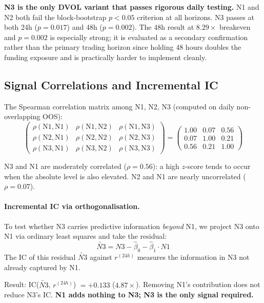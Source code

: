 \documentclass[12pt, a4paper]{article}
\theoremstyle{plain}
\theoremstyle{definition}
\begin{document}
\textbf{N3 is the only DVOL variant that passes rigorous daily testing.}
N1 and N2 both fail the block-bootstrap $p < 0.05$ criterion at all horizons.
N3 passes at both 24h ($p = 0.017$) and 48h ($p = 0.002$). The 48h result
at $8.29\times$ breakeven and $p = 0.002$ is especially strong; it is
evaluated as a secondary confirmation rather than the primary trading horizon
since holding 48 hours doubles the funding exposure and is practically
harder to implement cleanly.

\subsection{Signal Correlations and Incremental IC}
\label{sec:incremental}

The Spearman correlation matrix among N1, N2, N3 (computed on daily
non-overlapping OOS):
\[
  \begin{pmatrix}
    \rho(\text{N1},\text{N1}) & \rho(\text{N1},\text{N2}) & \rho(\text{N1},\text{N3}) \\
    \rho(\text{N2},\text{N1}) & \rho(\text{N2},\text{N2}) & \rho(\text{N2},\text{N3}) \\
    \rho(\text{N3},\text{N1}) & \rho(\text{N3},\text{N2}) & \rho(\text{N3},\text{N3})
  \end{pmatrix}
  =
  \begin{pmatrix}
    1.00 & 0.07 & 0.56 \\
    0.07 & 1.00 & 0.21 \\
    0.56 & 0.21 & 1.00
  \end{pmatrix}
\]

N3 and N1 are moderately correlated ($\rho = 0.56$): a high $z$-score
tends to occur when the absolute level is also elevated. N2 and N1
are nearly uncorrelated ($\rho = 0.07$).

\paragraph{Incremental IC via orthogonalisation.}
To test whether N3 carries predictive information \emph{beyond} N1, we
project N3 onto N1 via ordinary least squares and take the residual:
\[
  \tilde{N3} = N3 - \hat{\beta}_0 - \hat{\beta}_1 \cdot N1
\]
The IC of this residual $\tilde{N3}$ against $r^{(24h)}$ measures the
information in N3 not already captured by N1.

Result: IC($\tilde{N3}$, $r^{(24h)}$) $= +0.133$ ($4.87\times$).
Removing N1's contribution does not reduce N3's IC.
\textbf{N1 adds nothing to N3; N3 is the only signal required.}
\end{document}
